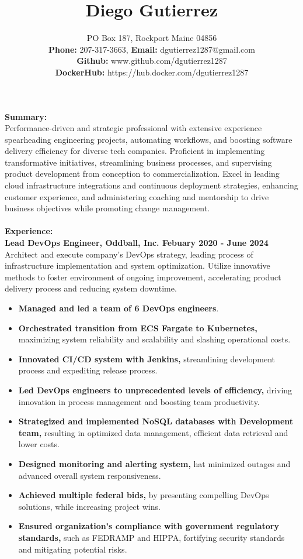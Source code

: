 \documentclass[10pt]{article}
\title{Diego Gutierrez}
\date{}
\author{%
	PO Box 187, Rockport Maine 04856\\
	\textbf{Phone:} 207-317-3663, \textbf{Email:} dgutierrez1287@gmail.com\\
	\textbf{Github:} www.github.com/dgutierrez1287\\
	\textbf{DockerHub:} https://hub.docker.com/dgutierrez1287
}
\makeatletter
\renewcommand{\maketitle}{\bgroup\setlength{\parindent}{0pt}
	\begin{flushleft}
		\LARGE\textbf{\@title}
		
		\normalsize\@author
	\end{flushleft}\egroup
}
\makeatother
\begin{document}
\maketitle
\thispagestyle{empty} %
\noindent\Large\textbf{Summary:}\\
\normalsize Performance-driven and strategic professional with extensive experience spearheading engineering projects, 
automating workflows, and boosting software delivery efficiency for diverse tech companies. Proficient in implementing transformative initiatives, 
streamlining business processes, and supervising product development from conception to commercialization. Excel in leading cloud infrastructure 
integrations and continuous deployment strategies, enhancing customer experience, and administering coaching and mentorship to drive business 
objectives while promoting change management.
\\
\\
\noindent\Large\textbf{Experience:}\\
\normalsize
\textbf{Lead DevOps Engineer, Oddball, Inc. \hfill{Febuary 2020 - June 2024}}\\
\normalsize Architect and execute company's DevOps strategy, leading process of infrastructure implementation and system optimization. 
Utilize innovative methods to foster environment of ongoing improvement, accelerating product delivery process and reducing system downtime.
\begin{itemize}
\small
\item \textbf{Managed and led a team of 6 DevOps engineers}.
\item \textbf{Orchestrated transition from ECS Fargate to Kubernetes,} maximizing system reliability and scalability and slashing operational costs.
\item \textbf{Innovated CI/CD system with Jenkins,} streamlining development process and expediting release process.
\item \textbf{Led DevOps engineers to unprecedented levels of efficiency,} driving innovation in process management and boosting
team productivity. 
\item \textbf{Strategized and implemented NoSQL databases with Development team,} resulting in optimized data management,
efficient data retrieval and lower costs.
\item \textbf{Designed monitoring and alerting system,} hat minimized outages and advanced overall system responsiveness.
\item \textbf{Achieved multiple federal bids,} by presenting compelling DevOps solutions, while increasing project wins.
\item \textbf{Ensured organization's compliance with government regulatory standards,} such as FEDRAMP and HIPPA, fortifying
security standards and mitigating potential risks.
\end{itemize}
\end{document}
